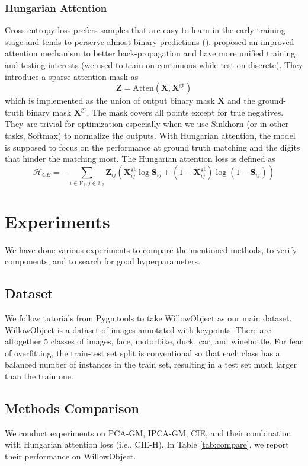 \documentclass[a4paper]{article}
\begin{document}
\subsubsection{Hungarian Attention}

Cross-entropy loss prefers samples that are easy to learn in the early training stage and tends to perserve almost binary predictions (\cite{cie}). \cite{cie} proposed an improved attention mechanism to better back-propagation and have more unified training and testing interests (we used to train on continuous while test on discrete). They introduce a sparse attention mask as 
$$
\mathbf{Z} = \mathrm{Atten} \left(\mathbf{X}, \mathbf{X}^{\mathrm{gt}}\right)
$$
which is implemented as the union of output binary mask $\mathbf{X}$ and the ground-truth binary mask $\mathbf{X}^{\mathrm{gt}}$. The mask covers all points except for true negatives. They are trivial for optimization especially when we use Sinkhorn (or in other tasks, Softmax) to normalize the outputs. With Hungarian attention, the model is supposed to focus on the performance at ground truth matching and the digits that hinder the matching most. The Hungarian attention loss is defined as 
$$
\mathcal{H}_{CE} = -\sum_{i\in \mathcal{V}_1, j\in \mathcal{V}_2 } \mathbf{Z}_{ij} \left(\mathbf{X}_{ij}^{\mathrm{gt}} \log\mathbf{S}_{ij} + \left(1-\mathbf{X}_{ij}^{\mathrm{gt}}\right) \log \left(1- \mathbf{S}_{ij}\right) \right)
$$


\section{Experiments}
We have done various experiments to compare the mentioned methods, to verify components, and to search for good hyperparameters. 

\subsection{Dataset}
We follow tutorials from Pygmtools \cite{pygmtools} to take WillowObject \cite{willow} as our main dataset. WillowObject is a dataset of images annotated with keypoints. There are altogether $5$ classes of images, face, motorbike, duck, car, and winebottle. For fear of overfitting, the train-test set split is conventional so that each class has a balanced number of instances in the train set, resulting in a test set much larger than the train one. 

\subsection{Methods Comparison}
We conduct experiments on PCA-GM, IPCA-GM, CIE, and their combination with Hungarian attention loss (i.e., CIE-H). In Table \ref{tab:compare}, we report their performance on WillowObject.
\end{document}
